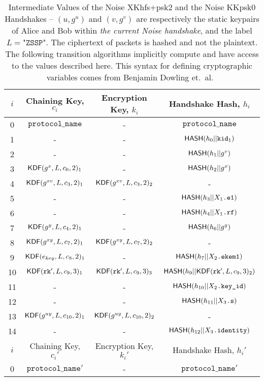 \documentclass{article}
\begin{document}
\begin{table}
	\caption{Intermediate Values of the Noise XKhfs+psk2 and the Noise KKpsk0 Handshakes \cite{noise_protocol} \cite{noise_hfs} -- $(u, g^u)$ and $(v, g^v)$ are respectively the static keypairs of Alice and Bob within \emph{the current Noise handshake}, and the label $L=\texttt{"ZSSP"}$. The ciphertext of packets is hashed and not the plaintext. The following transition algorithms implicitly compute and have access to the values described here. This syntax for defining cryptographic variables comes from Benjamin Dowling et.~al.~\cite{wireguard_analysis}}
	\centering
	\renewcommand{\arraystretch}{1.05}
	\begin{tabular}{ | c | c | c | c | }
		\hline
		$i$ & Chaining Key, $c_i$ & Encryption Key, $k_i$ & Handshake Hash, $h_i$ \\
		\hline
		0 & $\texttt{protocol\_name}$ & - & $\texttt{protocol\_name}$ \\
		1 & - & - & $\text{\sf HASH}(h_0||\texttt{kid}_1)$ \\
		2 & - & - & $\text{\sf HASH}(h_1||g^v)$ \\
		3 & $\text{\sf KDF}(g^x, L, c_0, 2)_1$ & - & $\text{\sf HASH}(h_2||g^x)$ \\
		4 & $\text{\sf KDF}(g^{xv}, L, c_3, 2)_1$ & $\text{\sf KDF}(g^{xv}, L, c_3, 2)_2$ & - \\
		5 & - & - & $\text{\sf HASH}(h_3||X_1\texttt{.e1})$ \\
		6 & - & - & $\text{\sf HASH}(h_4||X_1\texttt{.rf})$ \\
		\hline
		7 & $\text{\sf KDF}(g^y, L, c_4, 2)_1$ & - & $\text{\sf HASH}(h_6||g^y)$ \\
		8 & $\text{\sf KDF}(g^{xy}, L, c_7, 2)_1$ & $\text{\sf KDF}(g^{xy}, L, c_7, 2)_2$ & - \\
		9 & $\text{\sf KDF}(e_{key}, L, c_8, 2)_1$ & - & $\text{\sf HASH}(h_7||X_2\texttt{.ekem1})$ \\
		10 & $\text{\sf KDF}(\texttt{rk}', L, c_9, 3)_1$ & $\text{\sf KDF}(\texttt{rk}', L, c_9, 3)_3$ & $\text{\sf HASH}(h_9||\text{\sf KDF}(\texttt{rk}', L, c_9, 3)_2)$ \\
		11 & - & - & $\text{\sf HASH}(h_{10}||X_2\texttt{.key\_id})$ \\
		\hline
		12 & - & - & $\text{\sf HASH}(h_{11}||X_3\texttt{.s})$ \\
		13 & $\text{\sf KDF}(g^{uy}, L, c_{10}, 2)_1$ & $\text{\sf KDF}(g^{uy}, L, c_{10}, 2)_2$ & - \\
		14 & - & - & $\text{\sf HASH}(h_{12}||X_3\texttt{.identity})$ \\
		\hline
		\hline
		$i$ & Chaining Key, $c_i'$ & Encryption Key, $k_i'$ & Handshake Hash, $h_i'$ \\
		\hline
		0 & $\texttt{protocol\_name}'$ & - & $\texttt{protocol\_name}'$ \\

\end{tabular}
\end{table}
\end{document}

